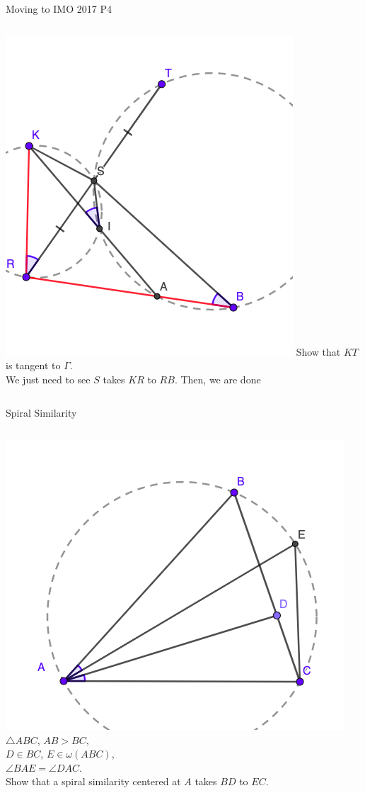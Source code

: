 \documentclass{beamer}
\begin{document}
\begin{frame}{Moving to IMO 2017 P4}
	\begin{columns}
		\includegraphics[scale=0.46]{spi6.png}
		Show that $KT$ is tangent to $\Gamma$.\\
		\phantom{Spacing}
		We just need to see $S$ takes $KR$ to $RB$. Then, we are
		done \Laughey
	\end{columns}
\end{frame}
\begin{frame}{Spiral Similarity}
	\begin{columns}
		\column{0.6\textwidth}
		\includegraphics[scale=0.34]{spi7.png}
		\column{0.4\textwidth}
		$\triangle ABC$, $AB >  BC$,\\ 
		$D\in BC$, $E\in \omega(ABC)$,\\
		$\angle BAE = \angle DAC$.\\
		\phantom{Spacing}
		Show that a spiral similarity centered at $A$ takes
		$BD$ to $EC$.
	\end{columns}
\end{frame}
\end{document}
